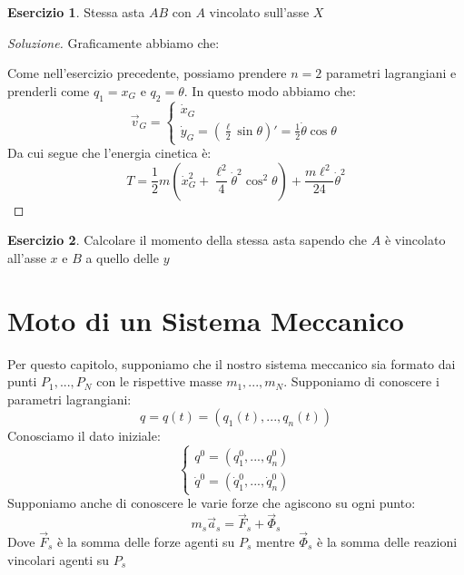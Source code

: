 \documentclass[11pt,a4paper,twoside]{article}
\theoremstyle{definition}
\newtheorem{ese}{Esercizio}[section]
\newenvironment{sol}
	{\renewcommand\qedsymbol{$\blacksquare$}\begin{proof}[Soluzione]}
	{\end{proof}}
\begin{document}
\begin{ese}\label{123}
	Stessa asta $AB$ con $A$ vincolato sull'asse $X$
\end{ese}
\begin{sol}
	Graficamente abbiamo che:
	\begin{center}
	\end{center}
	Come nell'esercizio precedente, possiamo prendere $n=2$ parametri lagrangiani e prenderli come $q_1 = x_G$ e $q_2 = \theta$. In questo modo abbiamo che:
	\[ \vec v_G= \begin{cases} \dot x_G\\ \dot y_G = (\frac \ell 2 \sin \theta)' = \frac 12 \dot \theta \cos \theta \end{cases} \]
	Da cui segue che l'energia cinetica è:
	\[ T = \frac 12 m \left(\dot x_G^2 + \frac {\ell^2}4 \dot \theta^2 \cos^2 \theta\right) + \frac{m\ell^2}{24} \dot \theta^2\]
\end{sol}

\begin{ese}\label{124}
	Calcolare il momento della stessa asta sapendo che $A$ è vincolato all'asse $x$ e $B$ a quello delle $y$
\end{ese}

\newpage

\section{Moto di un Sistema Meccanico}

Per questo capitolo, supponiamo che il nostro sistema meccanico sia formato dai punti $P_1,...,P_N$ con le rispettive masse $m_1,...,m_N$. Supponiamo di conoscere i parametri lagrangiani:
\[ q = q(t) = (q_1(t),...,q_n(t)) \]
Conosciamo il dato iniziale:
\[
	\begin{cases}
		q^0 = (q_1^0,...,q_n^0)\\
		\dot q^0 = (\dot q_1^0,...,\dot q_n^0)
	\end{cases}
\]
Supponiamo anche di conoscere le varie forze che agiscono su ogni punto:
\[ m_s\vec a_s = \vec F_s + \vec \Phi_s \]
Dove $\vec F_s$ è la somma delle forze agenti su $P_s$ mentre $\vec \Phi_s$ è la somma delle reazioni vincolari agenti su $P_s$
\end{document}

